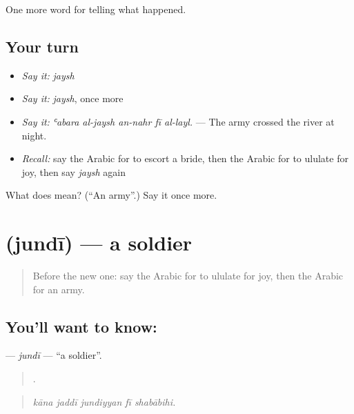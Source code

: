 \begin{grammarlens}[title={What you've built}]
One more word for telling what happened.
\end{grammarlens}

\subsection*{Your turn}
\begin{itemize}
\raggedright
  \item \emph{Say it:} \emph{jaysh}
  \item \emph{Say it:} \emph{jaysh}, once more
  \item \emph{Say it:} \emph{ʿabara al-jaysh an-nahr fī al-layl.} — The army crossed the river at night.
  \item \emph{Recall:} say the Arabic for to escort a bride, then the Arabic for to ululate for joy, then say \emph{jaysh} again
\end{itemize}

\begin{tcolorbox}[breakable,colback=teal!4,colframe=teal!35!black,title={Before you move on}]
What does  mean? (\textquotedblleft{}An army\textquotedblright{}.) Say it once more.
\end{tcolorbox}
\section[\texorpdfstring{\ar{جندي} (jundī)}{جندي (jundī)}]{ (jundī) — a soldier}

\label{lesson:AR-C307-jundi}



\begin{quote}
Before the new one: say the Arabic for to ululate for joy, then the Arabic for an army.
\end{quote}

\subsection*{You'll want to know: }
\textbf{} — \emph{jundī} — \textquotedblleft{}a soldier\textquotedblright{}.

\begin{quote}
    .
\end{quote}

\begin{quote}
\emph{kāna jaddī jundiyyan fī shabābihi.}
\end{quote}


